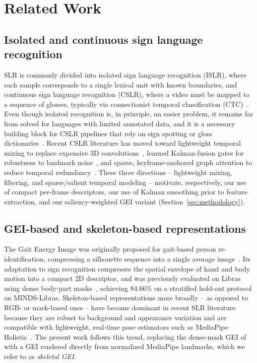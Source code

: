 \documentclass[journal]{IEEEtran}
\begin{document}
\section{Related Work}
\label{sec:related}

\subsection{Isolated and continuous sign language recognition}
SLR is commonly divided into isolated sign language recognition (ISLR), where each sample corresponds to a single lexical unit with known boundaries, and continuous sign language recognition (CSLR), where a video must be mapped to a sequence of glosses, typically via connectionist temporal classification (CTC)~\cite{koller2020survey,phoenix2014}. Even though isolated recognition is, in principle, an easier problem, it remains far from solved for languages with limited annotated data, and it is a necessary building block for CSLR pipelines that rely on sign spotting or gloss dictionaries~\cite{momeni2020bsldict}. Recent CSLR literature has moved toward lightweight temporal mixing to replace expensive 3D convolutions~\cite{jiang2026}, learned Kalman-fusion gates for robustness to landmark noise~\cite{zhang2024}, and sparse, keyframe-anchored graph attention to reduce temporal redundancy~\cite{ye2026}. These three directions -- lightweight mixing, filtering, and sparse/salient temporal modeling -- motivate, respectively, our use of compact per-frame descriptors, our use of Kalman smoothing prior to feature extraction, and our saliency-weighted GEI variant (Section~\ref{sec:methodology}).

\subsection{GEI-based and skeleton-based representations}
The Gait Energy Image was originally proposed for gait-based person re-identification, compressing a silhouette sequence into a single average image~\cite{han2006gei}. Its adaptation to sign recognition compresses the spatial envelope of hand and body motion into a compact 2D descriptor, and was previously evaluated on Libras using dense body-part masks~\cite{passos2021}, achieving $84.66\%$ on a stratified hold-out protocol on MINDS-Libras. Skeleton-based representations more broadly -- as opposed to RGB- or mask-based ones -- have become dominant in recent SLR literature because they are robust to background and appearance variation and are compatible with lightweight, real-time pose estimators such as MediaPipe Holistic~\cite{lugaresi2019mediapipe,goyal2023mediapipe,lin2023mediapipe}. The present work follows this trend, replacing the dense-mask GEI of~\cite{passos2021} with a GEI rendered directly from normalized MediaPipe landmarks, which we refer to as \emph{skeletal GEI}.
\end{document}
